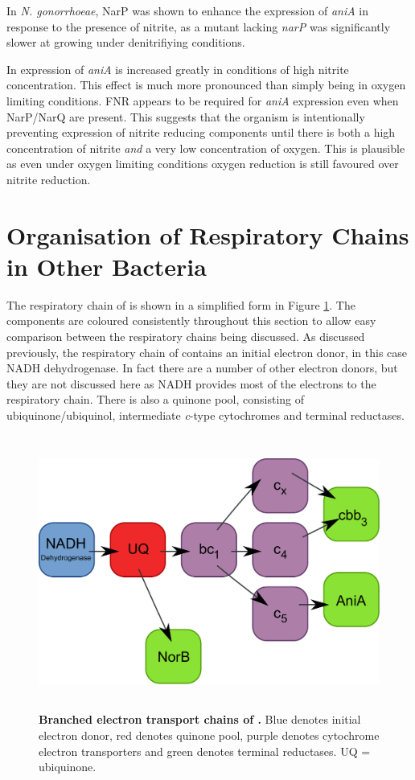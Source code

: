 In \textit{N. gonorrhoeae}, NarP was shown to enhance the expression of \textit{aniA} in response to the presence of nitrite, as a mutant lacking \textit{narP} was significantly slower at growing under denitrifiying conditions\cite{Overton2006}.

In \Nm{} expression of \textit{aniA} is increased greatly in conditions of high nitrite concentration\cite{Rock2005}. This effect is much more pronounced than simply being in oxygen limiting conditions. FNR appears to be required for \textit{aniA} expression even when NarP/NarQ are present\cite{Rock2005}. This suggests that the organism is intentionally preventing expression of nitrite reducing components until there is both a high concentration of nitrite \textit{and} a very low concentration of oxygen. This is plausible as even under oxygen limiting conditions oxygen reduction is still favoured over nitrite reduction.

\section{Organisation of Respiratory Chains in Other Bacteria}
The respiratory chain of \Nm{} is shown in a simplified form in Figure \ref{fig:nm_resp}. The components are coloured consistently throughout this section to allow easy comparison between the respiratory chains being discussed. As discussed previously, the respiratory chain of \Nm{} contains an initial electron donor, in this case NADH dehydrogenase. In fact there are a number of other electron donors, but they are not discussed here as NADH provides most of the electrons to the respiratory chain. There is also a quinone pool, consisting of ubiquinone/ubiquinol, intermediate \textit{c}-type cytochromes and terminal reductases.

\begin{figure}[tbp]
\begin{center}
	\includegraphics[height=9cm]{01-introduction/data/nm_resp.pdf}
	\caption[{Branched electron transport chains of \Nm{}.}]{{\bf Branched electron transport chains of \Nm{}.} Blue denotes initial electron donor, red denotes quinone pool, purple denotes cytochrome electron transporters and green denotes terminal reductases. UQ = ubiquinone.
	\label{fig:nm_resp}}
\end{center}
\end{figure}

